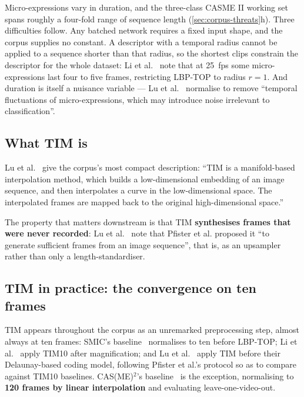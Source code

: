 Micro-expressions vary in duration, and the three-class CASME II working set spans roughly a four-fold range of sequence length (\autoref{sec:corpus-threats}h). Three difficulties follow. Any batched network requires a fixed input shape, and the corpus supplies no constant. A descriptor with a temporal radius cannot be applied to a sequence shorter than that radius, so the shortest clips constrain the descriptor for the whole dataset: Li et al.~\cite{liX2018} note that at 25~fps some micro-expressions last four to five frames, restricting LBP-TOP to radius $r = 1$. And duration is itself a nuisance variable --- Lu et al.~\cite{lu2015} normalise to remove ``temporal fluctuations of micro-expressions, which may introduce noise irrelevant to classification''.

\subsection{What TIM is}
\label{sec:tim-what}

Lu et al.~\cite{lu2015} give the corpus's most compact description: ``TIM is a manifold-based interpolation method, which builds a low-dimensional embedding of an image sequence, and then interpolates a curve in the low-dimensional space. The interpolated frames are mapped back to the original high-dimensional space.''

The property that matters downstream is that TIM \textbf{synthesises frames that were never recorded}: Lu et al.~\cite{lu2015} note that Pfister et al. proposed it ``to generate sufficient frames from an image sequence'', that is, as an upsampler rather than only a length-standardiser.

\subsection{TIM in practice: the convergence on ten frames}
\label{sec:tim-ten-frames}

TIM appears throughout the corpus as an unremarked preprocessing step, almost always at ten frames: SMIC's baseline~\cite{liX2013} normalises to ten before LBP-TOP; Li et al.~\cite{liX2018} apply TIM10 after magnification; and Lu et al.~\cite{lu2015} apply TIM before their Delaunay-based coding model, following Pfister et al.'s protocol so as to compare against TIM10 baselines. CAS(ME)$^2$'s baseline~\cite{qu2016} is the exception, normalising to \textbf{120 frames by linear interpolation} and evaluating leave-one-video-out.


